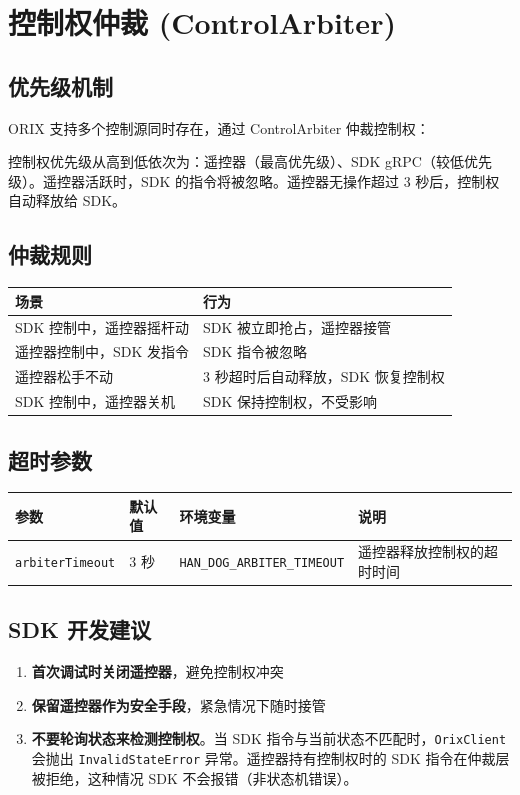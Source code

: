 \documentclass[a4paper,11pt,openany]{book}
\begin{document}
\section{控制权仲裁 (ControlArbiter)}

\subsection{优先级机制}

ORIX 支持多个控制源同时存在，通过 ControlArbiter 仲裁控制权：

控制权优先级从高到低依次为：遥控器（最高优先级）、SDK gRPC（较低优先级）。遥控器活跃时，SDK 的指令将被忽略。遥控器无操作超过 3 秒后，控制权自动释放给 SDK。

\subsection{仲裁规则}

\begin{longtable}{ll}
\toprule
场景 & 行为 \\
\midrule
\endhead
SDK 控制中，遥控器摇杆动 & SDK 被立即抢占，遥控器接管 \\
遥控器控制中，SDK 发指令 & SDK 指令被忽略 \\
遥控器松手不动 & 3 秒超时后自动释放，SDK 恢复控制权 \\
SDK 控制中，遥控器关机 & SDK 保持控制权，不受影响 \\
\bottomrule
\end{longtable}

\subsection{超时参数}

\begin{longtable}{llll}
\toprule
参数 & 默认值 & 环境变量 & 说明 \\
\midrule
\endhead
\texttt{arbiterTimeout} & 3 秒 & \texttt{HAN\_DOG\_ARBITER\_TIMEOUT} & 遥控器释放控制权的超时时间 \\
\bottomrule
\end{longtable}

\subsection{SDK 开发建议}

\begin{enumerate}[nosep]
  \item \textbf{首次调试时关闭遥控器}，避免控制权冲突
  \item \textbf{保留遥控器作为安全手段}，紧急情况下随时接管
  \item \textbf{不要轮询状态来检测控制权}。当 SDK 指令与当前状态不匹配时，\texttt{OrixClient} 会抛出 \texttt{InvalidStateError} 异常。遥控器持有控制权时的 SDK 指令在仲裁层被拒绝，这种情况 SDK 不会报错（非状态机错误）。
\end{enumerate}
\end{document}
